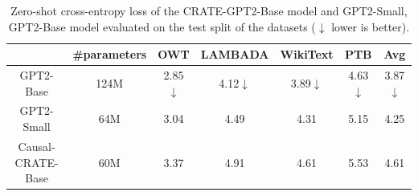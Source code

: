 \documentclass[../../book-main.tex]{subfiles}
\begin{document}
\begin{table}
\def\arraystretch{1.1}
    \small
    \caption{\small Zero-shot cross-entropy loss of the CRATE-GPT2-Base model and GPT2-Small, GPT2-Base model evaluated on the test split of the datasets ($\downarrow$ lower is better). 
    }
    \centering
    \begin{tabular}{ccccccc}
    \hline
    & \#parameters & \textbf{OWT} & \textbf{LAMBADA} & \textbf{WikiText} & \textbf{PTB} & \textbf{Avg} \\
     \hline
     GPT2-Base  & {124M} & 2.85$\downarrow$ & 4.12$\downarrow$ & 3.89$\downarrow$ & 4.63$\downarrow$ & 3.87$\downarrow$ \\
     {GPT2-Small } &  {64M} & {3.04} & {4.49} & {4.31} & {5.15} & {4.25} \\
     Causal-CRATE-Base & {60M} & 3.37 & 4.91 & 4.61 & 5.53 & 4.61 \\
     \hline
    \end{tabular}
    \label{tab:gpt-eval}
\end{table} 


\end{document}
